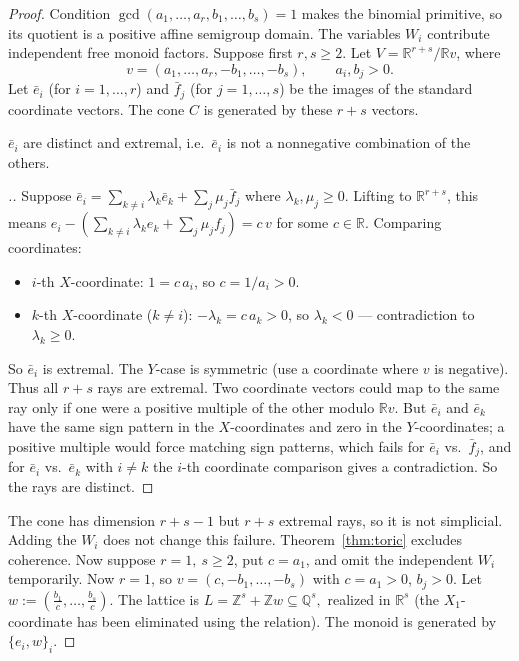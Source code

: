 \documentclass[11pt,a4paper]{amsart}
\numberwithin{equation}{section}
\newenvironment{PROOF}[2][\proofname.]
{\begin{proof}[#1]\renewcommand{\qedsymbol}{\textsquare$_{\rm #2}$}}
	{\end{proof}}
\begin{document}
 \begin{proof}
 Condition $\gcd(a_1,\ldots,a_r,b_1,\ldots,b_s)=1$ makes the binomial primitive, so its quotient is a
positive affine semigroup domain. The variables $W_i$ contribute
independent free monoid factors.
Suppose first $r,s\geq2$. 
Let \(V=\mathbb{R}^{r+s}/\mathbb{R}v\), where
\[
v=(a_1,\dots,a_r,-b_1,\dots,-b_s),\qquad a_i,b_j>0.
\]
Let \(\bar e_i\) (for \(i=1,\dots,r\)) and \(\bar f_j\) (for \(j=1,\dots,s\)) be the images of the standard coordinate vectors. The cone \(C\) is generated by these \(r+s\) vectors.

\begin{claim}\label{pd}
\(\bar e_i\) are distinct and  extremal, i.e.\ \(\bar e_i\) is not a nonnegative combination of the others.
\end{claim}

\begin{PROOF}{\ref{pd}}
Suppose
$\bar e_i=\sum_{k\ne i}\lambda_k\bar e_k+\sum_{j}\mu_j\bar f_j$ where $\lambda_k,\mu_j\ge 0.$	Lifting to \(\mathbb{R}^{r+s}\), this means
$e_i-(\sum_{k\ne i}\lambda_k e_k+\sum_j\mu_j f_j)=c\,v$
for some \(c\in\mathbb{R}\). Comparing coordinates:
\begin{itemize}
\item {\(i\)-th \(X\)-coordinate:} \(1=c\,a_i\), so \(c=1/a_i>0\).
\item {\(k\)-th \(X\)-coordinate (\(k\ne i\)):} \(-\lambda_k=c\,a_k>0\), so \(\lambda_k<0\) --- contradiction to \(\lambda_k\ge0\).
\end{itemize}
So \(\bar e_i\) is extremal. The \(Y\)-case is symmetric (use a coordinate where \(v\) is negative). Thus all \(r+s\) rays are extremal. 
Two coordinate vectors could map to the same ray only if one were a positive multiple of the other modulo \(\mathbb{R}v\). But \(\bar e_i\) and \(\bar e_k\) have the same sign pattern in the \(X\)-coordinates and zero in the \(Y\)-coordinates; a positive multiple would force matching sign patterns, which fails for \(\bar e_i\) vs.\ \(\bar f_j\), and for \(\bar e_i\) vs.\ \(\bar e_k\) with \(i\ne k\) the \(i\)-th coordinate comparison gives a contradiction. So the rays are distinct.
\end{PROOF}



The cone has dimension $r+s-1$ but $r+s$ extremal rays,	so it is not simplicial. Adding the $W_i$ does not change this
failure. Theorem~\ref{thm:toric} excludes coherence.
Now suppose $r=1,\ s\geq2$, put $c=a_1$, and omit the	independent $W_i$ temporarily. 
Now \(r=1\), so \(v=(c,-b_1,\dots,-b_s)\) with \(c=a_1>0\), \(b_j>0\). Let $w:=(\tfrac{b_1}{c},\dots,\tfrac{b_s}{c})$. The lattice is
$L=\mathbb{Z}^s+\mathbb{Z}w\subseteq \mathbb{Q}^s,$ realized in \(\mathbb{R}^s\) (the \(X_1\)-coordinate has been eliminated using the relation).  The monoid is generated by
$\{e_i, w\}_i.$


\end{proof}
\end{document}
